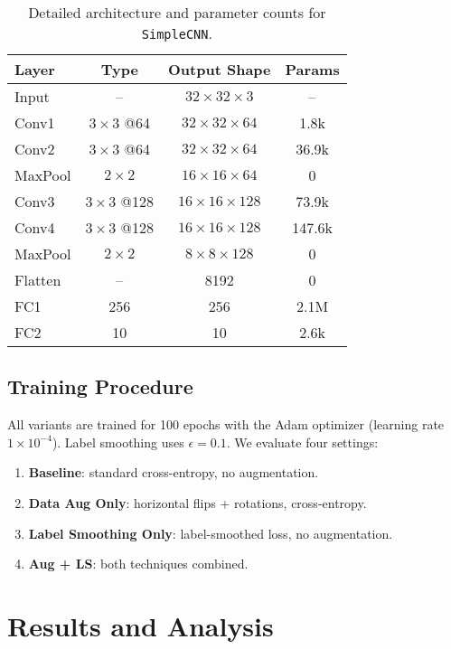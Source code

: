 \documentclass[11pt]{article}
\begin{document}
\begin{table}[h]
  \centering
  \begin{tabular}{@{}lccc@{}}
    \toprule
    \textbf{Layer} & \textbf{Type} & \textbf{Output Shape} & \textbf{Params} \\
    \midrule
    Input & -- & $32\times32\times3$ & -- \\
    Conv1 & $3\times3$ @64 & $32\times32\times64$ & 1.8k \\
    Conv2 & $3\times3$ @64 & $32\times32\times64$ & 36.9k \\
    MaxPool & $2\times2$ & $16\times16\times64$ & 0 \\
    Conv3 & $3\times3$ @128 & $16\times16\times128$ & 73.9k \\
    Conv4 & $3\times3$ @128 & $16\times16\times128$ & 147.6k \\
    MaxPool & $2\times2$ & $8\times8\times128$ & 0 \\
    Flatten & -- & 8192 & 0 \\
    FC1 & 256 & 256 & 2.1M \\
    FC2 & 10 & 10 & 2.6k \\
    \bottomrule
  \end{tabular}
  \caption{Detailed architecture and parameter counts for \texttt{SimpleCNN}.}
  \label{tab:layers}
\end{table}

\subsection{Training Procedure}
All variants are trained for 100 epochs with the Adam optimizer (learning rate $1\times10^{-4}$). Label smoothing uses $\epsilon = 0.1$. We evaluate four settings:
\begin{enumerate}
  \item \textbf{Baseline}: standard cross-entropy, no augmentation.
  \item \textbf{Data Aug Only}: horizontal flips + rotations, cross-entropy.
  \item \textbf{Label Smoothing Only}: label-smoothed loss, no augmentation.
  \item \textbf{Aug + LS}: both techniques combined.
\end{enumerate}

\section{Results and Analysis}
\end{document}
